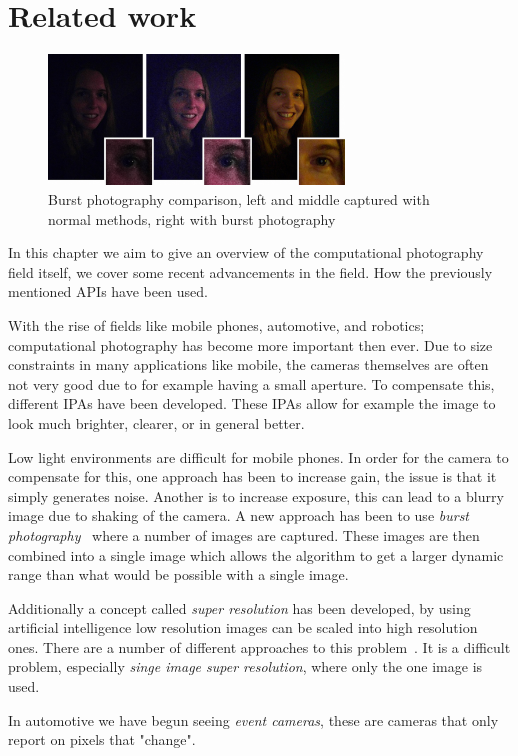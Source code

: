 \chapter{Related work\label{discussion}}
\begin{figure}[ht]
    \begin{center}
        \includegraphics[width=0.70\textwidth]{figures/lowlight.png}
    \end{center}
    \caption{Burst photography comparison, left and middle captured with normal methods, right with burst photography~\cite{hasinoff2016burst}}\label{fig:lowlight}
\end{figure}

In this chapter we aim to give an overview of the computational photography
field itself, we cover some recent advancements in the field. How the
previously mentioned APIs have been used.

With the rise of fields like mobile phones, automotive, and robotics;
computational photography has become more important then ever. Due to size
constraints in many applications like mobile, the cameras themselves are often
not very good due to for example having a small aperture. To compensate this,
different IPAs have been developed. These IPAs allow for example the image to
look much brighter, clearer, or in general better.

Low light environments are difficult for mobile phones. In order for the camera
to compensate for this, one approach has been to increase gain, the issue is
that it simply generates noise. Another is to increase exposure, this can lead
to a blurry image due to shaking of the camera. A new approach has been to use
\textit{burst photography}~\cite{hasinoff2016burst} where a number of images
are captured. These images are then combined into a single image which allows
the algorithm to get a larger dynamic range than what would be possible with a
single image.

Additionally a concept called \textit{super resolution} has been developed, by
using artificial intelligence low resolution images can be scaled into high
resolution ones. There are a number of different approaches to this problem~\cite{yang2019deep, chen2022real}. It is a difficult problem, especially \textit{singe image super resolution},
where only the one image is used.

In automotive we have begun seeing \textit{event cameras}, these are cameras
that only report on pixels that "change".
